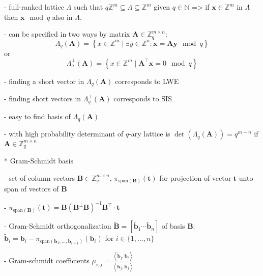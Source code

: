 \documentclass[
  a4paper,  %
  twoside,  %
  bibliography=totoc,
  headsepline,
  cleardoublepage=empty,
  parskip=half,
  draft=false
]{scrbook}
\begin{document}
- full-ranked lattice $\Lambda$ such that $q\mathbb{Z}^m \subseteq	\Lambda \subseteq	\mathbb{Z}^m$ given $q \in \mathbb{N}$ => if $\mathbf{x} \in \mathbb{Z}^m$ in $\Lambda$ then $\mathbf{x} \mod q$ also in $\Lambda$.

- can be specified in two ways by matrix $\mathbf{A} \in \mathbb{Z}_q^{m\times n}$: %
\begin{equation}
  \Lambda_q(\mathbf{A}) = \left\{ x \in \mathbb{Z}^m \mid \exists y \in \mathbb{Z}^n : \mathbf{x} = \mathbf{A}\mathbf{y} \mod q \right\}
\end{equation}
or
\begin{equation}
  \Lambda_q^\perp(\mathbf{A}) = \left\{ x \in \mathbb{Z}^m \mid  \mathbf{A}^\intercal\mathbf{x} = 0 \mod q \right\}
\end{equation}

- finding a short vector in $\Lambda_q(\mathbf{A})$ corresponds to LWE %

- finding short vectors in $\Lambda_q^\perp(\mathbf{A})$ corresponds to SIS %

- easy to find basis of $\Lambda_q(\mathbf{A})$ \cite{AFG13}

- with high probability determinant of $q$-ary lattice is $\det(\Lambda_q(\mathbf{A}))=q^{m-n}$ if $\mathbf{A} \in \mathbb{Z}_q^{m\times n}$ %


* Gram-Schmidt basis \label{sec:gram-schmidt}%

- set of column vectors $\mathbf{B} \in \mathbb{Z}_q^{m\times n}$, $\pi_{\text{span}(\mathbf{B})}(\mathbf{t})$ for projection of vector $\mathbf{t}$ unto span of vectors of $\mathbf{B}$

- $\pi_{\text{span}(\mathbf{B})}(\mathbf{t}) = \mathbf{B}(\mathbf{B}^\perp \mathbf{B})^{-1}\mathbf{B}^\intercal \cdot \mathbf{t}$

- Gram-Schmidt orthogonalization $\tilde{\mathbf{B}} = \left[\tilde{\mathbf{b}}_1 \cdots \tilde{\mathbf{b}}_n\right]$ of basis $\mathbf{B}$: $\tilde{\mathbf{b}}_i = \mathbf{b}_i - \pi_{\text{span}(\mathbf{b}_1, \ldots, \mathbf{b}_{i-1})}(\mathbf{b}_i)$ for $i \in \{1, \ldots, n\}$

- Gram-schmidt coefficients $\mu_{i, j} = \frac{\left\langle \tilde{\mathbf{b}}_j, \mathbf{b}_i\right\rangle}{\left\langle \tilde{\mathbf{b}}_j, \tilde{\mathbf{b}}_j\right\rangle}$ %
\end{document}
